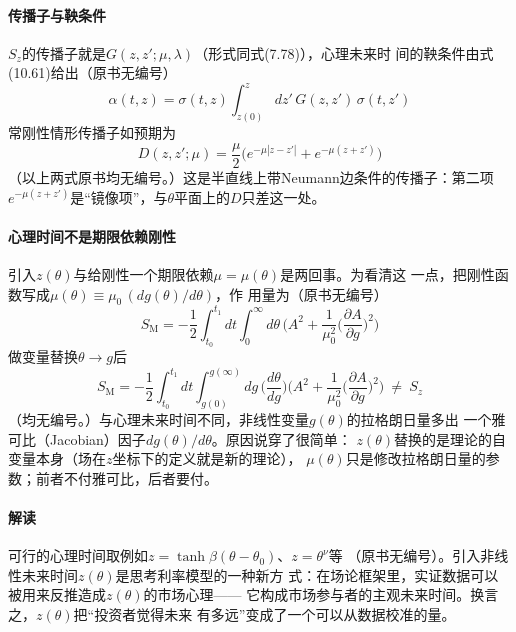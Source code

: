 \paragraph{传播子与鞅条件}
$S_{z}$的传播子就是$G(z,z';\mu,\lambda)$（形式同式(7.78)），心理未来时
间的鞅条件由式(10.61)给出（原书无编号）
\begin{equation*}
\alpha(t,z)=\sigma(t,z)\int_{z(0)}^{z}dz'\,G(z,z')\,\sigma(t,z')
\end{equation*}
常刚性情形传播子如预期为
\begin{equation*}
D(z,z';\mu)=\frac{\mu}{2}\bigl(e^{-\mu|z-z'|}+e^{-\mu(z+z')}\bigr)
\end{equation*}
（以上两式原书均无编号。）这是半直线上带Neumann边条件的传播子：第二项
$e^{-\mu(z+z')}$是“镜像项”，与$\theta$平面上的$D$只差这一处。

\paragraph{心理时间不是期限依赖刚性}
引入$z(\theta)$与给刚性一个期限依赖$\mu=\mu(\theta)$是两回事。为看清这
一点，把刚性函数写成$\mu(\theta)\equiv\mu_{0}\,(dg(\theta)/d\theta)$，作
用量为（原书无编号）
\begin{equation*}
S_{\text{M}}=-\frac{1}{2}\int_{t_{0}}^{t_{1}}dt\int_{0}^{\infty}d\theta\,
\Biggl(A^{2}+\frac{1}{\mu_{0}^{2}}\biggl(\frac{\partial A}{\partial g}
\biggr)^{2}\Biggr)
\end{equation*}
做变量替换$\theta\to g$后
\begin{equation*}
S_{\text{M}}=-\frac{1}{2}\int_{t_{0}}^{t_{1}}dt\int_{g(0)}^{g(\infty)}dg\,
\biggl(\frac{d\theta}{dg}\biggr)\Biggl(A^{2}+\frac{1}{\mu_{0}^{2}}
\biggl(\frac{\partial A}{\partial g}\biggr)^{2}\Biggr)\ \neq\ S_{z}
\end{equation*}
（均无编号。）与心理未来时间不同，非线性变量$g(\theta)$的拉格朗日量多出
一个雅可比（Jacobian）因子$dg(\theta)/d\theta$。原因说穿了很简单：
$z(\theta)$替换的是理论的自变量本身（场在$z$坐标下的定义就是新的理论），
$\mu(\theta)$只是修改拉格朗日量的参数；前者不付雅可比，后者要付。

\paragraph{解读}
可行的心理时间取例如$z=\tanh\beta(\theta-\theta_{0})$、$z=\theta^{\nu}$等
（原书无编号）。引入非线性未来时间$z(\theta)$是思考利率模型的一种新方
式：在场论框架里，实证数据可以被用来反推造成$z(\theta)$的市场心理——
它构成市场参与者的主观未来时间。换言之，$z(\theta)$把“投资者觉得未来
有多远”变成了一个可以从数据校准的量。

